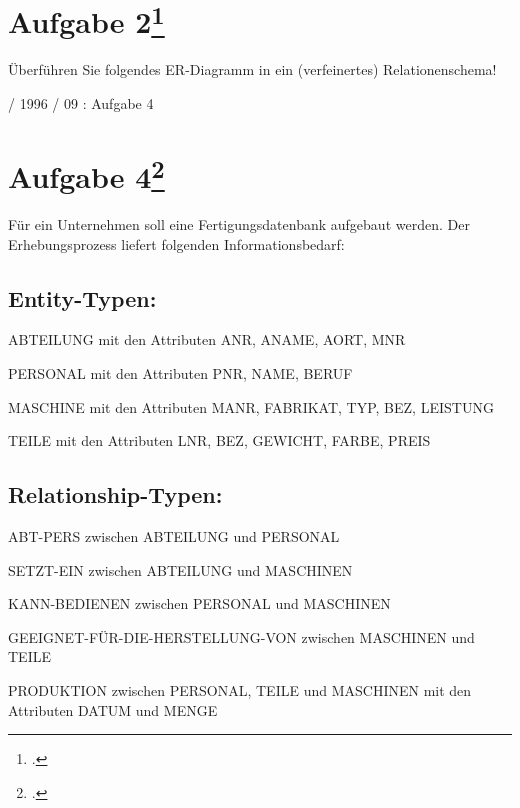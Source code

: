 \documentclass{lehramt-informatik}
\begin{document}
%
\section{Aufgabe 2\footcite{db:ab:7}}

Überführen Sie folgendes ER-Diagramm in ein (verfeinertes)
Relationenschema!

%

 / 1996 / 09 : Aufgabe 4

%
\section{Aufgabe 4\footcite{db:ab:7}}

Für ein Unternehmen soll eine Fertigungsdatenbank aufgebaut werden. Der
Erhebungsprozess liefert folgenden Informationsbedarf:

\subsection{Entity-Typen:}

\begin{compactitem}
\item ABTEILUNG mit den Attributen ANR, ANAME, AORT, MNR
\item PERSONAL mit den Attributen PNR, NAME, BERUF
\item MASCHINE mit den Attributen MANR, FABRIKAT, TYP, BEZ, LEISTUNG
\item TEILE mit den Attributen LNR, BEZ, GEWICHT, FARBE, PREIS
\end{compactitem}

\subsection{Relationship-Typen:}

\begin{compactitem}
\item ABT-PERS zwischen ABTEILUNG und PERSONAL
\item SETZT-EIN zwischen ABTEILUNG und MASCHINEN
\item KANN-BEDIENEN zwischen PERSONAL und MASCHINEN
\item GEEIGNET-FÜR-DIE-HERSTELLUNG-VON zwischen MASCHINEN und TEILE
\item PRODUKTION zwischen PERSONAL, TEILE und MASCHINEN mit den Attributen
DATUM und MENGE
\end{compactitem}
\end{document}
